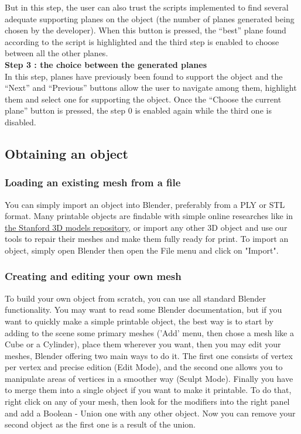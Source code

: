 \documentclass{article}
\begin{document}
But in this step, the user can also trust the scripts implemented to find several adequate supporting planes on the object (the number of planes generated being chosen by the developer). When this button is pressed, the ``best'' plane found according to the script is highlighted and the third step is enabled to choose between all the other planes.\\

\textbf{Step 3 : the choice between the generated planes}\\ 

In this step, planes have previously been found to support the object and the ``Next'' and ``Previous'' buttons allow the user to navigate among them, highlight them and select one for supporting the object. Once the ``Choose the current plane'' button is pressed, the step 0 is enabled again while the third one is disabled. 

\subsection{Obtaining an object}

\subsubsection{Loading an existing mesh from a file}

You can simply import an object into Blender, preferably from a PLY or STL format. Many printable objects are findable with simple online researches like in \href{http://graphics.stanford.edu/data/3Dscanrep/}{the Stanford 3D models repository}, or import any other 3D object and use our tools to repair their meshes and make them fully ready for print.
To import an object, simply open Blender then open the File menu and click on "Import".

\subsubsection{Creating and editing your own mesh}

To build your own object from scratch, you can use all standard Blender functionality. You may want to read some Blender documentation, but if you want to quickly make a simple printable object, the best way is to start by adding to the scene some primary meshes ('Add' menu, then chose a mesh like a Cube or a Cylinder), place them wherever you want, then you may edit your meshes, Blender offering two main ways to do it. The first one consists of vertex per vertex and precise edition (Edit Mode), and the second one allows you to manipulate areas of vertices in a smoother way (Sculpt Mode). Finally you have to merge them into a single object if you want to make it printable. To do that, right click on any of your mesh, then look for the modifiers into the right panel and add a Boolean - Union one with any other object. Now you can remove your second object as the first one is a result of the union.
\end{document}
